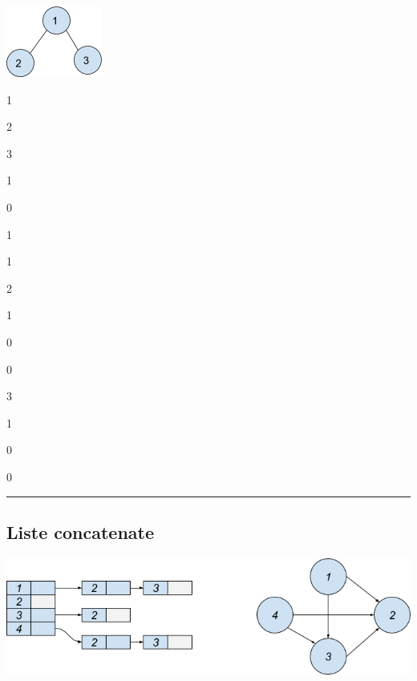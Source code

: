 \documentclass{article}
\begin{document}
{}

{}

\protect\hypertarget{t.1db15af38187ce98dc87977567f42b70be1e9c99}{}{}\protect\hypertarget{t.38}{}{}

{\includegraphics{images/image535.png}}

{}

{1}

{2}

{3}

{1}

{0}

{1}

{1}

{2}

{1}

{0}

{0}

{3}

{1}

{0}

{0}

{}

{}

\begin{center}\rule{0.5\linewidth}{\linethickness}\end{center}

\subsection{\texorpdfstring{{}}{}}\label{h.fq77zq901ude}

\hypertarget{h.qwq1tiruc9xg}{\subsection{\texorpdfstring{{Liste
concatenate}}{Liste concatenate}}\label{h.qwq1tiruc9xg}}

{}

{\includegraphics{images/image537.png}}
\end{document}
